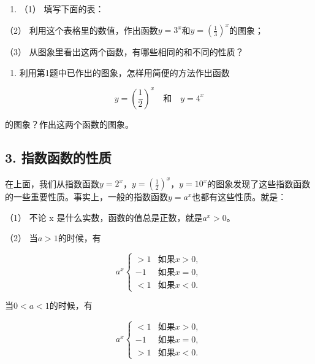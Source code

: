 \begin{enumerate}[start=2]
\item
  （1） 填写下面的表：
\end{enumerate}

{\centering
\small\setlength{\tabcolsep}{3pt}%
\par
}

（2）
利用这个表格里的数值，作出函数\(y = 3^x\)和\(y = \left(\frac{1}{3}\right)^x\)的图象；

（3） 从图象里看出这两个函数，有哪些相同的和不同的性质？

\begin{enumerate}[start=3]
\item
  利用第1题中已作出的图象，怎样用简便的方法作出函数
\end{enumerate}

\[
y = \left(\frac{1}{2}\right)^{x} \quad \text{和} \quad y = 4^{x}
\]

的图象？作出这两个函数的图象。

\subsection{3. 指数函数的性质}

在上面，我们从指数函数\(y = 2^x\)，\(y = \left(\frac{1}{2}\right)^x\)，\(y = 10^x\)的图象发现了这些指数函数的一些重要性质。事实上，一般的指数函数\(y = a^x\)也都有这些性质。就是：

（1） 不论 x 是什么实数，函数的值总是正数，就是\(a^{x} > 0\)。

（2） 当\(a > 1\)的时候，有

\[
a^{x} \left\{ \begin{array}{ll} {> 1} & {\text{如果} x > 0,} \\ {- 1} & {\text{如果} x = 0,} \\ {< 1} & {\text{如果} x < 0.} \end{array} \right.
\]

当\(0 < a < 1\)的时候，有

\[
a^{x} \left\{ \begin{array}{ll} {< 1} & {\text{如果} x > 0,} \\ {- 1} & {\text{如果} x = 0,} \\ {> 1} & {\text{如果} x < 0.} \end{array} \right.
\]

